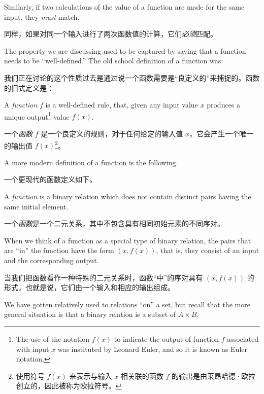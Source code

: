 Similarly, if two calculations of the
value of a function are made for the same input, they \emph{must} match.

同样，如果对同一个输入进行了两次函数值的计算，它们\emph{必须}匹配。

The property we are discussing used to be captured by saying that a 
function needs to be ``well-defined.''  The old school definition of a 
function was: 

我们正在讨论的这个性质过去是通过说一个函数需要是“良定义的”来捕捉的。函数的旧式定义是：

\begin{defi}
 A \emph{function} $f$ is a well-defined rule, that, given any input
value $x$ produces a unique output\footnote{The use of the notation %
$f(x)$ to indicate the output of function $f$ associated with input $x$ %
was instituted by Leonard Euler, and so it is known as Euler notation.} 
value $f(x)$.
\end{defi}

\begin{defi}
一个\emph{函数} $f$ 是一个良定义的规则，对于任何给定的输入值 $x$，它会产生一个唯一的输出值 $f(x)$\footnote{使用符号 $f(x)$ 来表示与输入 $x$ 相关联的函数 $f$ 的输出是由莱昂哈德·欧拉创立的，因此被称为欧拉符号。}。
\end{defi}

A more modern definition of a function is the following.

一个更现代的函数定义如下。

\begin{defi}
 A \emph{function} is a binary relation which does not contain
distinct pairs having the same initial element.
\end{defi}

\begin{defi}
一个\emph{函数}是一个二元关系，其中不包含具有相同初始元素的不同序对。
\end{defi}

When we think of a function as a special type of binary relation, 
the pairs that are ``in'' the function have the form $(x, f(x))$,
that is, they consist of an input and the corresponding output.

当我们把函数看作一种特殊的二元关系时，函数“中”的序对具有 $(x, f(x))$ 的形式，也就是说，它们由一个输入和相应的输出组成。

We have gotten relatively used to relations ``on'' a set, but recall
that the more general situation is that a binary relation is 
a subset of $A \times B$.

